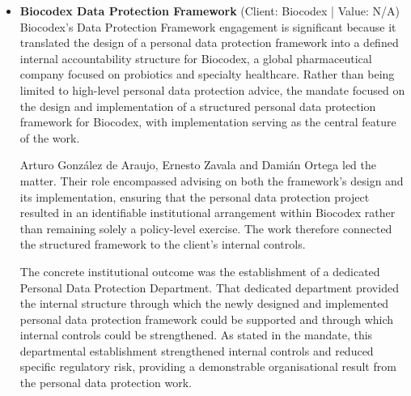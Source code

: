\documentclass[11pt]{article}
\begin{document}
\begin{itemize}
MEGA DIRECT, S.A. de C.V. instructed the firm in relation to data protection and database-related matters over this 16-year period. The work included representing the client in legal proceedings concerning the acquisition, processing, storage and protection of data. Those proceedings placed the full lifecycle of the client’s data handling before a legal forum: from acquisition and processing through to storage and protection. In a highly regulated environment, the representation required the team to address the legal issues connected with those distinct stages while maintaining focus on the client’s ability to continue operating.

Arturo González de Araujo, Ernesto Zavala and Damián Ortega led the representation and the continuing advice. Their involvement connects the contentious proceedings with the wider data protection and database-related mandate, demonstrating sustained partner-level attention across 16 years. The stated outcome was business continuity for MEGA DIRECT, S.A. de C.V. in the context of legal proceedings concerning its data acquisition, processing, storage and protection activities.
\item \textbf{Biocodex Data Protection Framework} (Client: Biocodex | Value: N/A)\\ Biocodex’s Data Protection Framework engagement is significant because it translated the design of a personal data protection framework into a defined internal accountability structure for Biocodex, a global pharmaceutical company focused on probiotics and specialty healthcare. Rather than being limited to high-level personal data protection advice, the mandate focused on the design and implementation of a structured personal data protection framework for Biocodex, with implementation serving as the central feature of the work.

Arturo González de Araujo, Ernesto Zavala and Damián Ortega led the matter. Their role encompassed advising on both the framework’s design and its implementation, ensuring that the personal data protection project resulted in an identifiable institutional arrangement within Biocodex rather than remaining solely a policy-level exercise. The work therefore connected the structured framework to the client’s internal controls.

The concrete institutional outcome was the establishment of a dedicated Personal Data Protection Department. That dedicated department provided the internal structure through which the newly designed and implemented personal data protection framework could be supported and through which internal controls could be strengthened. As stated in the mandate, this departmental establishment strengthened internal controls and reduced specific regulatory risk, providing a demonstrable organisational result from the personal data protection work.


\end{itemize}
\end{document}
